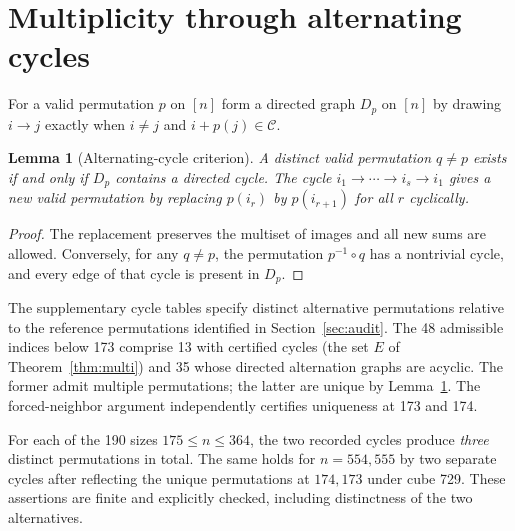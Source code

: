 \documentclass[9pt]{extarticle}
\newtheorem{lemma}[theorem]{Lemma}
\newcommand{\C}{\mathcal C}
\begin{document}
\section{Multiplicity through alternating cycles}\label{sec:multi}
For a valid permutation $p$ on $[n]$ form a directed graph $D_p$ on $[n]$ by drawing $i\to j$ exactly when $i\ne j$ and $i+p(j)\in\C$.
\begin{lemma}[Alternating-cycle criterion]\label{lem:cycle}
A distinct valid permutation $q\ne p$ exists if and only if $D_p$ contains a directed cycle. The cycle $i_1\to\cdots\to i_s\to i_1$ gives a new valid permutation by replacing $p(i_r)$ by $p(i_{r+1})$ for all $r$ cyclically.
\end{lemma}
\begin{proof}
The replacement preserves the multiset of images and all new sums are allowed. Conversely, for any $q\ne p$, the permutation $p^{-1}\circ q$ has a nontrivial cycle, and every edge of that cycle is present in $D_p$.
\end{proof}

The supplementary cycle tables specify distinct alternative permutations relative to the reference permutations identified in Section~\ref{sec:audit}. The 48 admissible indices below 173 comprise 13 with certified cycles (the set $E$ of Theorem~\ref{thm:multi}) and 35 whose directed alternation graphs are acyclic. The former admit multiple permutations; the latter are unique by Lemma~\ref{lem:cycle}. The forced-neighbor argument independently certifies uniqueness at 173 and 174.

For each of the 190 sizes $175\le n\le364$, the two recorded cycles produce \emph{three} distinct permutations in total. The same holds for $n=554, 555$ by two separate cycles after reflecting the unique permutations at $174, 173$ under cube 729. These assertions are finite and explicitly checked, including distinctness of the two alternatives.
\end{document}
